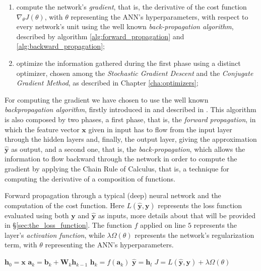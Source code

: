 		\begin{enumerate}
			\item compute the network's \textit{gradient}, that is, the derivative of the cost function
			$\nabla_{\theta} J(\theta)$, with $\theta$ representing the ANN's hyperparameters, with respect to
			every network's unit using the well known \textit{back-propagation algorithm}, described by
            algorithm \ref{alg:forward_propagation} and \ref{alg:backward_propagation};
			\item optimize the information gathered during the first phase using a distinct optimizer, chosen
			among the \textit{Stochastic Gradient Descent} and the \textit{Conjugate Gradient Method}, as
			described in Chapter \ref{cha:optimizers};
		\end{enumerate}

		For computing the gradient we have chosen to use
		the well known \textit{backpropagation algorithm}, firstly introduced in \cite{10028086174} and described
		in \cite{Goodfellow-et-al-2016,haykin2009neural,mitchell1997machine}. This algorithm is
		also composed by two phases, a first phase, that is, the \textit{forward propagation}, in which the
		feature vector $\mathbf{x}$ given in input has to flow from the input layer through the hidden layers and,
		finally, the output layer, giving the approximation $\hat{\mathbf{y}}$ as output, and a second one, that
		is, the \textit{back-propagation}, which allows the information to flow backward through the network in
		order to compute the gradient by applying the Chain Rule of Calculus, that is, a technique for computing the
		derivative of a composition of functions.

		\begin{algorithm}[H]
			\caption{Forward propagation through a typical (deep) neural network and the computation of the cost
			function. Here $L(\hat{\mathbf{y}}, \mathbf{y})$ represents the loss function evaluated using both
			$\mathbf{y}$ and $\hat{\mathbf{y}}$ as inputs, more details about that will be provided in
			\S \ref{sec:the_loss_function}. The function $f$ applied on line $5$ represents
			the layer's \textit{activation function}, while $\lambda \Omega(\theta)$ represents the
			network's regularization term, with $\theta$ representing the ANN's hyperparameters.}
			\label{alg:forward_propagation}
			\begin{algorithmic}[1]
					\State $\mathbf{h}_{0} = \mathbf{x}$
						\State $\mathbf{a}_{k} = \mathbf{b}_{k} + \mathbf{W}_{k}\mathbf{h}_{k - 1}$
						\State $\mathbf{h}_{k} = f(\mathbf{a}_{k})$
					\EndFor
					\State $\hat{\mathbf{y}} = \mathbf{h}_{l}$
					\State $J = L(\hat{\mathbf{y}}, \mathbf{y}) + \lambda \Omega(\theta)$
				\EndProcedure
			\end{algorithmic}
		\end{algorithm}

